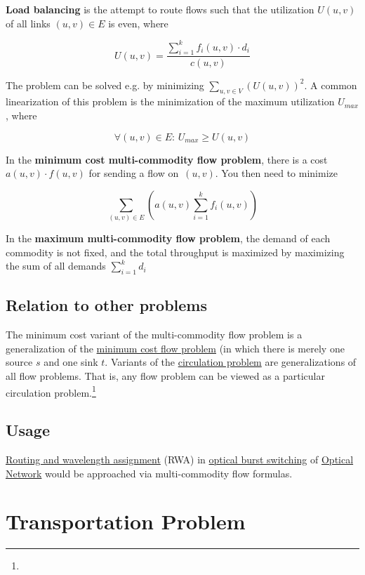 \begin{enumerate}
\textbf{Load balancing} is the attempt to route flows such that the
utilization \(U(u,v)\) of all links \((u,v)\in E\) is even, where

\[U(u,v)=\frac{\sum_{i=1}^{k} f_i(u,v)\cdot d_i}{c(u,v)}\]

The problem can be solved e.g. by minimizing
\(\sum_{u,v\in V} (U(u,v))^2\). A common linearization of this problem
is the minimization of the maximum utilization \(U_{max}\), where

\[\forall (u,v)\in E:\, U_{max} \geq U(u,v)\]

In the \textbf{minimum cost multi-commodity flow problem}, there is a
cost \(a(u,v) \cdot f(u,v)\) for sending a flow on \(\,(u,v)\). You then
need to minimize

\[\sum_{(u,v) \in E} \left( a(u,v) \sum_{i=1}^{k} f_i(u,v) \right)\]

In the \textbf{maximum multi-commodity flow problem}, the demand of each
commodity is not fixed, and the total throughput is maximized by
maximizing the sum of all demands \(\sum_{i=1}^{k} d_i\)

\hypertarget{relation-to-other-problems}{%
\subsection{Relation to other
problems}\label{relation-to-other-problems}}

The minimum cost variant of the multi-commodity flow problem is a
generalization of the \href{minimum_cost_flow_problem}{minimum cost flow
problem} (in which there is merely one source \(s\) and one sink \(t\).
Variants of the \href{circulation_problem}{circulation problem} are
generalizations of all flow problems. That is, any flow problem can be
viewed as a particular circulation problem.\footnote{}

\hypertarget{usage}{%
\subsection{Usage}\label{usage}}

\href{Routing_and_wavelength_assignment}{Routing and wavelength
assignment} (RWA) in \href{optical_burst_switching}{optical burst
switching} of \href{SONET}{Optical Network} would be approached via
multi-commodity flow formulas.


\section{Transportation Problem}


\end{enumerate}
